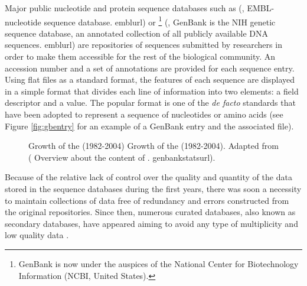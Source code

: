 Major public nucleotide and protein sequence databases such as 
\embl{}
(\citealp{kulikova:2004a}, 
    {}
    {%
      EMBL-nucleotide sequence database.
    }%
    {emblurl})
or \genbank{}\footnote{GenBank is now under the auspices of the National Center for Biotechnology Information (NCBI, United States).}
(\citealp{benson:2004a}, 
    {\genbank{}}
    {%
       GenBank is the NIH genetic sequence database, an annotated 
       collection of all publicly available DNA sequences.
    }%
    {emblurl})
are repositories of sequences submitted by researchers in order to make them accessible for the
rest of the biological community. An accession number and a set of annotations are provided for
each sequence entry. Using flat files as a standard format, the features of each sequence are displayed 
in a simple format that divides each line of information into two elements: a field descriptor and a 
value. The popular  format 
is one of the \emph{de facto} standards that have been 
adopted to represent a sequence of nucleotides or amino acids (see Figure \ref{fig:gbentry} for an
example of a GenBank entry and the associated  file).

\begin{figure}[t!]%
\begin{center}
\setlength{\fboxsep}{0pt}
          {Growth of the \genbank{} (1982-2004)}%
          {Growth of the \genbank{} (1982-2004).}%
          {Adapted from \genbank{} (
    {\genbank{}}
    {Overview about the content of \genbank{}.}
    {genbankstatsurl}).}
\end{center}
\end{figure}

Because of the relative lack of control over the quality and quantity of the data stored in the 
sequence databases during the first years, there was soon a necessity to maintain collections of data
free of redundancy and errors constructed from the original repositories. Since then, numerous curated 
databases, also known as secondary databases, have appeared aiming to avoid any type of multiplicity and 
low quality data \citep{baxevanis:2005a}. 


